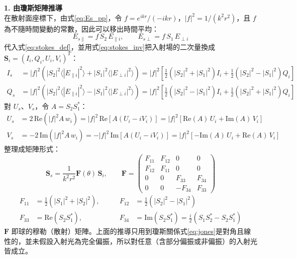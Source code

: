 \textbf{1. 由瓊斯矩陣推導}\\
在散射面座標下，由式\eqref{eq:Es_pp}，令 $f = e^{ikr}/(-ikr)$，$|f|^2 = 1/(k^2r^2)$，且 $f$ 為不隨時間變動的常數，因此可以移出時間平均：
\begin{equation}
    E_{s\parallel} = f\, S_2\, E_{\parallel i}, \qquad E_{s\perp} = f\, S_1\, E_{\perp i}
\end{equation}
代入式\eqref{eq:stokes_def}，並用式\eqref{eq:stokes_inv}把入射場的二次量換成 $\mathbf{S}_i = (I_i, Q_i, U_i, V_i)^{T}$：
\begin{align}
    I_s &= |f|^2 \left( |S_2|^2 \langle |E_{\parallel i}|^2 \rangle + |S_1|^2 \langle |E_{\perp i}|^2 \rangle \right) = |f|^2 \left[ \tfrac{1}{2}\left( |S_2|^2 + |S_1|^2 \right) I_i + \tfrac{1}{2}\left( |S_2|^2 - |S_1|^2 \right) Q_i \right] \\
    Q_s &= |f|^2 \left( |S_2|^2 \langle |E_{\parallel i}|^2 \rangle - |S_1|^2 \langle |E_{\perp i}|^2 \rangle \right) = |f|^2 \left[ \tfrac{1}{2}\left( |S_2|^2 - |S_1|^2 \right) I_i + \tfrac{1}{2}\left( |S_2|^2 + |S_1|^2 \right) Q_i \right]
\end{align}
對 $U_s$、$V_s$，令 $A = S_2 S_1^*$：
\begin{align}
    U_s &= 2\,\mathrm{Re}\left( |f|^2 A\, w_i \right) = |f|^2\, \mathrm{Re}\left[ A \left( U_i - iV_i \right) \right] = |f|^2 \left[ \mathrm{Re}(A)\, U_i + \mathrm{Im}(A)\, V_i \right] \\
    V_s &= -2\,\mathrm{Im}\left( |f|^2 A\, w_i \right) = -|f|^2\, \mathrm{Im}\left[ A \left( U_i - iV_i \right) \right] = |f|^2 \left[ -\mathrm{Im}(A)\, U_i + \mathrm{Re}(A)\, V_i \right]
\end{align}
整理成矩陣形式：
\begin{equation}
    \mathbf{S}_s = \frac{1}{k^2 r^2} \mathbf{F}(\theta)\, \mathbf{S}_i, \qquad \mathbf{F} = \begin{pmatrix} F_{11} & F_{12} & 0 & 0 \\ F_{12} & F_{11} & 0 & 0 \\ 0 & 0 & F_{33} & F_{34} \\ 0 & 0 & -F_{34} & F_{33} \end{pmatrix} \label{eq:mueller}
\end{equation}
\begin{equation}
    \begin{aligned}
        F_{11} &= \tfrac{1}{2}\left( |S_1|^2 + |S_2|^2 \right), \qquad & F_{12} &= \tfrac{1}{2}\left( |S_2|^2 - |S_1|^2 \right) \\
        F_{33} &= \mathrm{Re}\left( S_2 S_1^* \right), \qquad & F_{34} &= \mathrm{Im}\left( S_2 S_1^* \right) = \tfrac{i}{2}\left( S_1 S_2^* - S_2 S_1^* \right)
    \end{aligned}
\end{equation}
$\mathbf{F}$ 即球的穆勒（散射）矩陣。上面的推導只用到瓊斯關係式\eqref{eq:jones}是對角且線性的，並未假設入射光為完全偏振，所以對任意（含部分偏振或非偏振）的入射光皆成立。

